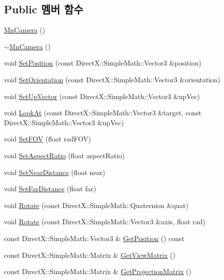 \subsection*{Public 멤버 함수}
\begin{DoxyCompactItemize}
\item 
\hyperlink{class_m_n_l_1_1_mn_camera_aff0b3d9da025157410805fc0c2e3659f}{Mn\+Camera} ()
\item 
\hyperlink{class_m_n_l_1_1_mn_camera_aebde880f88a052f4e7133de9de74509e}{$\sim$\+Mn\+Camera} ()
\item 
void \hyperlink{class_m_n_l_1_1_mn_camera_ab15d02ee68e0588a96a0c44ac486cd18}{Set\+Position} (const Direct\+X\+::\+Simple\+Math\+::\+Vector3 \&position)
\item 
void \hyperlink{class_m_n_l_1_1_mn_camera_ad9d9cc078cdeda1d5a8ef138a063c46f}{Set\+Orientation} (const Direct\+X\+::\+Simple\+Math\+::\+Vector3 \&orientation)
\item 
void \hyperlink{class_m_n_l_1_1_mn_camera_af287f66d56ecb6eba46efd12542e5cc6}{Set\+Up\+Vector} (const Direct\+X\+::\+Simple\+Math\+::\+Vector3 \&up\+Vec)
\item 
void \hyperlink{class_m_n_l_1_1_mn_camera_ad7fb1372db13a5ce955000a9597a9d48}{Look\+At} (const Direct\+X\+::\+Simple\+Math\+::\+Vector3 \&target, const Direct\+X\+::\+Simple\+Math\+::\+Vector3 \&up\+Vec)
\item 
void \hyperlink{class_m_n_l_1_1_mn_camera_a624327e866968d1df7fb73d2019d6aab}{Set\+F\+OV} (float rad\+F\+OV)
\item 
void \hyperlink{class_m_n_l_1_1_mn_camera_ac506b6bd606f8716e3dff87e80def299}{Set\+Aspect\+Ratio} (float aspect\+Ratio)
\item 
void \hyperlink{class_m_n_l_1_1_mn_camera_adb743c4f0499bc4b4346d39c1739cdb3}{Set\+Near\+Distance} (float near)
\item 
void \hyperlink{class_m_n_l_1_1_mn_camera_ab7c4cbd91462c20e32ac2b80aa83474c}{Set\+Far\+Distance} (float far)
\item 
void \hyperlink{class_m_n_l_1_1_mn_camera_a0e0d866c3cacedbceceed4dddaa0b473}{Rotate} (const Direct\+X\+::\+Simple\+Math\+::\+Quaternion \&quat)
\item 
void \hyperlink{class_m_n_l_1_1_mn_camera_ad6e912e0b1bae0cef9c41edeeb1a79da}{Rotate} (const Direct\+X\+::\+Simple\+Math\+::\+Vector3 \&axis, float rad)
\item 
const Direct\+X\+::\+Simple\+Math\+::\+Vector3 \& \hyperlink{class_m_n_l_1_1_mn_camera_a478d9bd34d90ae8bb06cdbb4193d48b7}{Get\+Position} () const
\item 
const Direct\+X\+::\+Simple\+Math\+::\+Matrix \& \hyperlink{class_m_n_l_1_1_mn_camera_a5b4d56e3d1d459da5c346831b1e43510}{Get\+View\+Matrix} ()
\item 
const Direct\+X\+::\+Simple\+Math\+::\+Matrix \& \hyperlink{class_m_n_l_1_1_mn_camera_a7b8773bec079b174185732f80e32d943}{Get\+Projection\+Matrix} ()
\end{DoxyCompactItemize}
